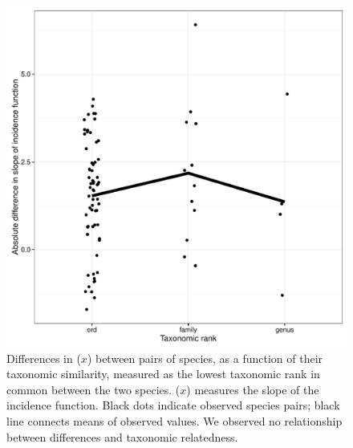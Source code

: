 \begin{figure}[htbp]
\centering
\includegraphics[width=5.5in]{figures/xbar.pdf}
\caption[Differences in (\(x\)) between pairs of species]{Differences in (\(x\)) between pairs of species, as a function of
their taxonomic similarity, measured as the lowest taxonomic rank in
common between the two species. (\(x\)) measures
the slope of the incidence function. Black dots indicate observed
species pairs; black line connects means of observed values. We observed
no relationship between differences and taxonomic relatedness.}
\label{fig:x_taxo}
\end{figure}


